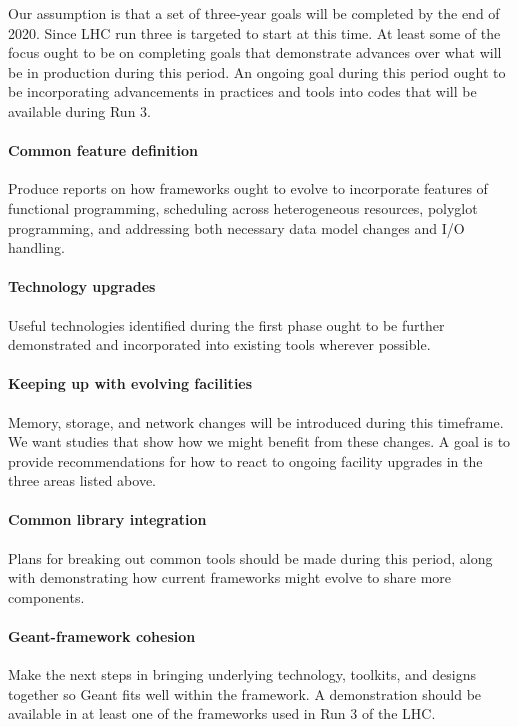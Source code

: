 \documentclass[12pt,a4paper]{article}
\begin{document}
Our assumption is that a set of three-year goals will be completed by
the end of 2020. Since LHC run three is targeted to start at this
time.  At least some of the focus ought to be on completing goals that
demonstrate advances over what will be in production during this
period.  An ongoing goal during this period ought to be incorporating
advancements in practices and tools into codes that will be available
during Run 3.

\paragraph{Common feature definition} Produce reports on how
frameworks ought to evolve to incorporate features of functional
programming, scheduling across heterogeneous resources, polyglot
programming, and addressing both necessary data model changes and I/O
handling.

\paragraph{Technology upgrades} Useful technologies identified during
the first phase ought to be further demonstrated and incorporated into
existing tools wherever possible.

\paragraph{Keeping up with evolving facilities} Memory, storage, and
network changes will be introduced during this timeframe. We want
studies that show how we might benefit from these changes. A goal is
to provide recommendations for how to react to ongoing facility
upgrades in the three areas listed above.

\paragraph{Common library integration} Plans for breaking out common
tools should be made during this period, along with demonstrating how
current frameworks might evolve to share more components.

\paragraph{Geant-framework cohesion} Make the next steps in bringing
underlying technology, toolkits, and designs together so Geant fits
well within the framework. A demonstration should be available in at
least one of the frameworks used in Run 3 of the LHC.
\end{document}

